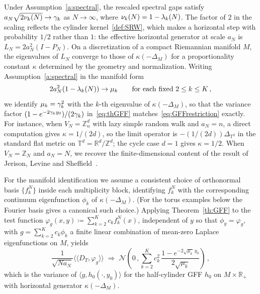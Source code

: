 \documentclass[11pt,a4paper,reqno]{amsart}
\theoremstyle{definition}
\newcommand{\cN}{\ensuremath{\mathcal N}}
\newcommand{\bbR}{{\ensuremath{\mathbb R}} }
\newcommand{\bbT}{{\ensuremath{\mathbb T}} }
\newcommand{\bbZ}{{\ensuremath{\mathbb Z}} }
\newcommand{\laa}{\langle \! \langle}
\newcommand{\raa}{\rangle \! \rangle}
\let\m=\mu   \let\n=\nu   \let\o=\omega    \let\p=\pi  \let\ph=\varphi
\begin{document}
Under Assumption~\ref{a:spectral}, the rescaled spectral gaps satisfy $a_N\sqrt{2\n_k(N)} \to \g_k$ as $N \to \infty$, where $\n_k(N) = 1 - \l_k(N)$. The factor of $2$ in the scaling reflects the cylinder kernel~\eqref{def:SRW}, which makes a horizontal step with probability $1/2$ rather than $1$: the effective horizontal generator at scale $a_N$ is $L_N = 2a_N^2(I - P_N)$. On a discretization of a compact Riemannian manifold $M$, the eigenvalues of $L_N$ converge to those of $\kappa(-\Delta_M)$ for a proportionality constant $\kappa$ determined by the geometry and normalization. Writing Assumption~\ref{a:spectral} in the manifold form
	\begin{equation}\label{eq:specconv}
	 2a_N^2(1 - \l_k(N)) \to \m_k \qquad \text{for each fixed } 2 \leq k \leq K\,,
	\end{equation}
we identify $\m_k = \g_k^2$ with the $k$-th eigenvalue of $\kappa(-\Delta_M)$, so that the variance factor $(1 - e^{-2\gamma_k y_0})/(2\gamma_k)$ in~\eqref{eq:thGFF} matches~\eqref{eq:GFFrestriction} exactly. For instance, when $V_N = \bbZ_n^d$ with lazy simple random walk and $a_N = n$, a direct computation gives $\kappa = 1/(2d)$, so the limit operator is $-(1/(2d))\Delta_{\bbT^d}$ in the standard flat metric on $\bbT^d = \bbR^d/\bbZ^d$; the cycle case $d = 1$ gives $\kappa = 1/2$. When $V_N = \bbZ_N$ and $a_N = N$, we recover the finite-dimensional content of the result of Jerison, Levine and Sheffield~\cite{jerison2014internal2}.

For the manifold identification we assume a consistent choice of orthonormal basis $\{f_k^N\}$ inside each multiplicity block, identifying $f_k^N$ with the corresponding continuum eigenfunction $\phi_k$ of $\kappa(-\Delta_M)$. (For the torus examples below the Fourier basis gives a canonical such choice.) Applying Theorem~\ref{th:GFF} to the test function $\varphi_g(x, y) \coloneqq \sum_{k=2}^K c_k f_k^N(x)$, independent of $y$ so that $\phi_g = \varphi_g$, with $g = \sum_{k=2}^K c_k \phi_k$ a finite linear combination of mean-zero Laplace eigenfunctions on $M$, yields
	\begin{equation}\label{eq:cormanifold}
	\frac{1}{\sqrt{Na_N}} \laa D_T, \varphi_g \raa
	\;\Rightarrow\; \cN\!\left( 0\,, \sum_{k=2}^K c_k^2\, \frac{1 - e^{-2\sqrt{\m_k}\, y_0}}{2\sqrt{\m_k}} \right)\,,
	\end{equation}
which is the variance of $\langle g, h_0(\cdot, y_0)\rangle$ for the half-cylinder GFF $h_0$ on $M \times \bbR_+$ with horizontal generator $\kappa(-\Delta_M)$.
\end{document}
